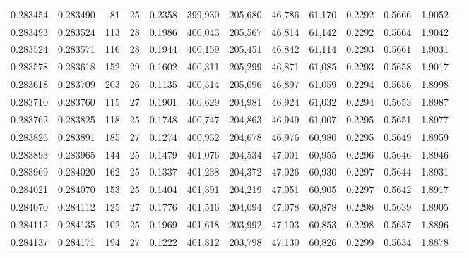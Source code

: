 \begin{tabular}{rrrrrrrrrrrrr}
0.283454 & 0.283490 &    81 &  25 &                                     0.2358 & 399,930 & 205,680 &  46,786 &  61,170 & 0.2292 & 0.5666 & 1.9052 \\
0.283493 & 0.283524 &   113 &  28 &                                     0.1986 & 400,043 & 205,567 &  46,814 &  61,142 & 0.2292 & 0.5664 & 1.9042 \\
0.283524 & 0.283571 &   116 &  28 &                                     0.1944 & 400,159 & 205,451 &  46,842 &  61,114 & 0.2293 & 0.5661 & 1.9031 \\
0.283578 & 0.283618 &   152 &  29 &                                     0.1602 & 400,311 & 205,299 &  46,871 &  61,085 & 0.2293 & 0.5658 & 1.9017 \\
0.283618 & 0.283709 &   203 &  26 &                                     0.1135 & 400,514 & 205,096 &  46,897 &  61,059 & 0.2294 & 0.5656 & 1.8998 \\
0.283710 & 0.283760 &   115 &  27 &                                     0.1901 & 400,629 & 204,981 &  46,924 &  61,032 & 0.2294 & 0.5653 & 1.8987 \\
0.283762 & 0.283825 &   118 &  25 &                                     0.1748 & 400,747 & 204,863 &  46,949 &  61,007 & 0.2295 & 0.5651 & 1.8977 \\
0.283826 & 0.283891 &   185 &  27 &                                     0.1274 & 400,932 & 204,678 &  46,976 &  60,980 & 0.2295 & 0.5649 & 1.8959 \\
0.283893 & 0.283965 &   144 &  25 &                                     0.1479 & 401,076 & 204,534 &  47,001 &  60,955 & 0.2296 & 0.5646 & 1.8946 \\
0.283969 & 0.284020 &   162 &  25 &                                     0.1337 & 401,238 & 204,372 &  47,026 &  60,930 & 0.2297 & 0.5644 & 1.8931 \\
0.284021 & 0.284070 &   153 &  25 &                                     0.1404 & 401,391 & 204,219 &  47,051 &  60,905 & 0.2297 & 0.5642 & 1.8917 \\
0.284070 & 0.284112 &   125 &  27 &                                     0.1776 & 401,516 & 204,094 &  47,078 &  60,878 & 0.2298 & 0.5639 & 1.8905 \\
0.284112 & 0.284135 &   102 &  25 &                                     0.1969 & 401,618 & 203,992 &  47,103 &  60,853 & 0.2298 & 0.5637 & 1.8896 \\
0.284137 & 0.284171 &   194 &  27 &                                     0.1222 & 401,812 & 203,798 &  47,130 &  60,826 & 0.2299 & 0.5634 & 1.8878 \\

\end{tabular}
